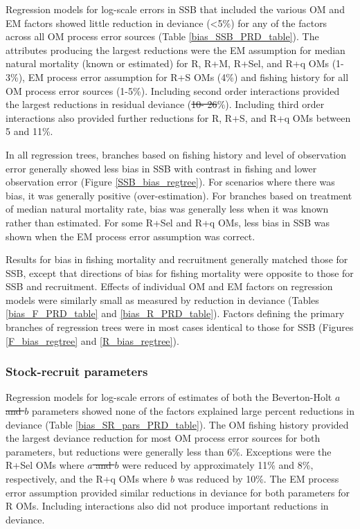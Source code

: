 \documentclass[
  12pt,
]{article}
\makeatletter
\providecommand{\DIFadd}[1]{{\protect\color{blue}\uwave{#1}}} %
\providecommand{\DIFdel}[1]{{\protect\color{red}\sout{#1}}} %
\providecommand{\DIFaddbegin}{} %
\providecommand{\DIFaddend}{} %
\providecommand{\DIFdelbegin}{} %
\providecommand{\DIFdelend}{} %
\providecommand{\DIFscaledelfig}{0.5}
\newlength{\DIFdelgraphicswidth} %
\newlength{\DIFdelgraphicsheight} %
\providecommand{\DIFaddincludegraphics}[2][]{{\color{blue}\fbox{\DIFOincludegraphics[#1]{#2}}}} %
\providecommand{\DIFdelincludegraphics}[2][]{%
\sbox{\DIFdelgraphicsbox}{\DIFOincludegraphics[#1]{#2}}%
\settoboxwidth{\DIFdelgraphicswidth}{\DIFdelgraphicsbox} %
\settoboxtotalheight{\DIFdelgraphicsheight}{\DIFdelgraphicsbox} %
\scalebox{\DIFscaledelfig}{%
\parbox[b]{\DIFdelgraphicswidth}{\usebox{\DIFdelgraphicsbox}\\[-\baselineskip] \rule{\DIFdelgraphicswidth}{0em}}\llap{\resizebox{\DIFdelgraphicswidth}{\DIFdelgraphicsheight}{%
\setlength{\unitlength}{\DIFdelgraphicswidth}%
\begin{picture}(1,1)%
\thicklines\linethickness{2pt} %
{\color[rgb]{1,0,0}\put(0,0){\framebox(1,1){}}}%
{\color[rgb]{1,0,0}\put(0,0){\line( 1,1){1}}}%
{\color[rgb]{1,0,0}\put(0,1){\line(1,-1){1}}}%
\end{picture}%
}\hspace*{3pt}}} %
} %
\DeclareRobustCommand{\DIFaddbegin}{\DIFOaddbegin \let\includegraphics\DIFaddincludegraphics} %
\DeclareRobustCommand{\DIFaddend}{\DIFOaddend \let\includegraphics\DIFOincludegraphics} %
\DeclareRobustCommand{\DIFdelbegin}{\DIFOdelbegin \let\includegraphics\DIFdelincludegraphics} %
\DeclareRobustCommand{\DIFdelend}{\DIFOaddend \let\includegraphics\DIFOincludegraphics} %
\let\sout@orig\sout %
\renewcommand{\sout}[1]{\ifmmode\text{\sout@orig{\ensuremath{#1}}}\else\sout@orig{#1}\fi} %
\makeatother
\begin{document}
Regression models for log-scale errors in SSB that included the various
OM and EM factors showed little reduction in deviance (\textless5\%) for
any of the factors across all OM process error sources (Table
\ref{bias_SSB_PRD_table}). The attributes producing the largest
reductions were the EM assumption for median natural mortality (known or
estimated) for R, R+M, R+Sel, and R+q OMs (1-3\%), EM process error
assumption for R+S OMs (4\%) and fishing history for all OM process
error sources (1-5\%). Including second order interactions provided the
largest reductions in residual deviance (\DIFdelbegin \DIFdel{10- 26}\DIFdelend \DIFaddbegin \DIFadd{10-26}\DIFaddend \%). Including third order
interactions also provided further reductions for R, R+S, and R+q OMs
between 5 and 11\%.

In all regression trees, branches based on fishing history and level of
observation error generally showed less bias in SSB with contrast in
fishing and lower observation error (Figure \ref{SSB_bias_regtree}). For
scenarios where there was bias, it was generally positive
(over-estimation). For branches based on treatment of median natural
mortality rate, bias was generally less when it was known rather than
estimated. For some R+Sel and R+q OMs, less bias in SSB was shown when
the EM process error assumption was correct.

Results for bias in fishing mortality and recruitment generally matched
those for SSB, except that directions of bias for fishing mortality were
opposite to those for SSB and recruitment. Effects of individual OM and
EM factors on regression models were similarly small as measured by
reduction in deviance (Tables \ref{bias_F_PRD_table} and
\ref{bias_R_PRD_table}). Factors defining the primary branches of
regression trees were in most cases identical to those for SSB (Figures
\ref{F_bias_regtree} and \ref{R_bias_regtree}).

\subsubsection*{Stock-recruit
parameters}\label{stock-recruit-parameters}

Regression models for log-scale errors of estimates of both the
Beverton-Holt \DIFdelbegin \DIFdel{\(a\) and \(b\) }\DIFdelend \DIFaddbegin \DIFadd{\(\alpha\) and \(\beta\) }\DIFaddend parameters showed none of the
factors explained large percent reductions in deviance (Table
\ref{bias_SR_pars_PRD_table}). The OM fishing history provided the
largest deviance reduction for most OM process error sources for both
parameters, but reductions were generally less than 6\%. Exceptions were
the R+Sel OMs where \DIFdelbegin \DIFdel{\(a\) and \(b\) }\DIFdelend \DIFaddbegin \DIFadd{\(\alpha\) and \(\beta\) }\DIFaddend were reduced by
approximately 11\% and 8\%, respectively, and the R+q OMs where
\DIFdelbegin \DIFdel{\(b\) }\DIFdelend \DIFaddbegin \DIFadd{\(\beta\) }\DIFaddend was reduced by 10\%. The EM process error assumption provided
similar reductions in deviance for both parameters for R OMs. Including
interactions also did not produce important reductions in deviance.
\end{document}
